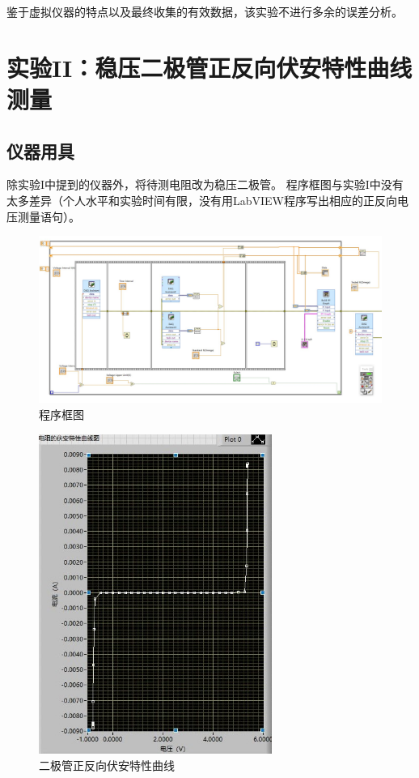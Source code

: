 \documentclass[12pt, a4paper]{ctexart}
\begin{document}
鉴于虚拟仪器的特点以及最终收集的有效数据，该实验不进行多余的误差分析。

\section{实验II：稳压二极管正反向伏安特性曲线测量}

\subsection{仪器用具}

除实验I中提到的仪器外，将待测电阻改为稳压二极管。
程序框图与实验I中没有太多差异（个人水平和实验时间有限，没有用LabVIEW程序写出相应的正反向电压测量语句）。

\begin{figure}[!h]
    \centering
    \includegraphics[width=5in]{./figure/Block Diagram(U-I).jpg}
    \caption{程序框图}
\end{figure}

\begin{figure}[!h]
    \centering
    \includegraphics[width=3in]{./figure/Diode.jpg}
    \caption{二极管正反向伏安特性曲线}
    \label{fig:2}
\end{figure}
\end{document}
